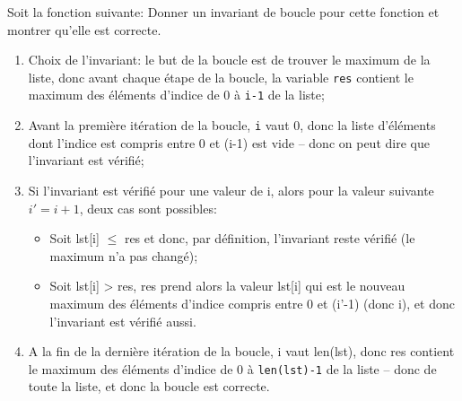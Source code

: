 \documentclass[12pt]{article}
\begin{document}
	\begin{MonExo}
		Soit la fonction suivante:
		Donner un invariant de boucle pour cette fonction et montrer qu'elle est correcte.
	\end{MonExo}
	
	\begin{MaReponse}
		\begin{enumerate}
			\item Choix de l'invariant: le but de la boucle est de trouver le maximum de la liste, donc avant chaque étape de la boucle, la variable \texttt{res} contient le maximum des éléments d'indice de 0 à \texttt{i-1} de la liste;
			\item Avant la première itération de la boucle, \texttt{i} vaut 0, donc la liste d'éléments dont l'indice est compris entre 0 et (i-1) est vide -- donc on peut dire que l'invariant est vérifié;
			\item Si l'invariant est vérifié pour une valeur de i, alors pour la valeur suivante $i' = i + 1$, deux cas sont possibles:
			\begin{itemize}
				\item Soit lst[i] $\leq$ res et donc, par définition, l'invariant reste vérifié (le maximum n'a pas changé);
				\item Soit lst[i] > res, res prend alors la valeur lst[i] qui est le nouveau maximum des éléments d'indice compris entre 0 et (i'-1) (donc i), et donc l'invariant est vérifié aussi.
			\end{itemize}
			\item A la fin de la dernière itération de la boucle, i vaut len(lst), donc res contient le maximum des éléments d'indice de 0 à \texttt{len(lst)-1} de la liste -- donc de toute la liste, et donc la boucle est correcte.
		\end{enumerate}
	\end{MaReponse}
		
\end{document}
